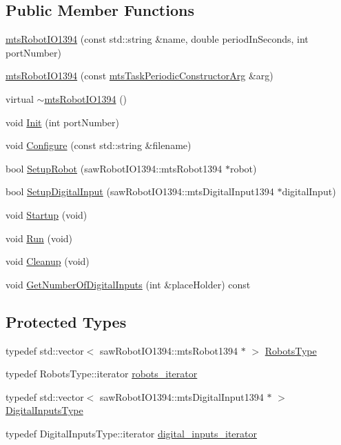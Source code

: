 \subsection*{Public Member Functions}
\begin{DoxyCompactItemize}
\item 
\hyperlink{classmts_robot_i_o1394_aee827574818e204a24ae21a0604a2547}{mts\+Robot\+I\+O1394} (const std\+::string \&name, double period\+In\+Seconds, int port\+Number)
\item 
\hyperlink{classmts_robot_i_o1394_a99cca8cfc575891d365ce310f984be99}{mts\+Robot\+I\+O1394} (const \hyperlink{classmts_task_periodic_constructor_arg}{mts\+Task\+Periodic\+Constructor\+Arg} \&arg)
\item 
virtual \hyperlink{classmts_robot_i_o1394_a0b6641e7214766380c3a786e5d264101}{$\sim$mts\+Robot\+I\+O1394} ()
\item 
void \hyperlink{classmts_robot_i_o1394_af8a3a179c51798e82d7d2494e6b44bb2}{Init} (int port\+Number)
\item 
void \hyperlink{classmts_robot_i_o1394_a306c3ced635583f7d0e197e0fd6118cb}{Configure} (const std\+::string \&filename)
\item 
bool \hyperlink{classmts_robot_i_o1394_acc8de15da51c663bd402c13958693b0e}{Setup\+Robot} (saw\+Robot\+I\+O1394\+::mts\+Robot1394 $\ast$robot)
\item 
bool \hyperlink{classmts_robot_i_o1394_af5a72252e919132a32cc2b800508bf16}{Setup\+Digital\+Input} (saw\+Robot\+I\+O1394\+::mts\+Digital\+Input1394 $\ast$digital\+Input)
\item 
void \hyperlink{classmts_robot_i_o1394_acd53cbdb68ee67bdc55da6312a407043}{Startup} (void)
\item 
void \hyperlink{classmts_robot_i_o1394_a01fea2cc930d89b666f603b27eed61ba}{Run} (void)
\item 
void \hyperlink{classmts_robot_i_o1394_a0ffa72f9f6d3c23d19cb592f325f8e39}{Cleanup} (void)
\item 
void \hyperlink{classmts_robot_i_o1394_a46df5d7d8527d73c5fdd40806899fbdb}{Get\+Number\+Of\+Digital\+Inputs} (int \&place\+Holder) const 
\end{DoxyCompactItemize}
\subsection*{Protected Types}
\begin{DoxyCompactItemize}
\item 
typedef std\+::vector$<$ saw\+Robot\+I\+O1394\+::mts\+Robot1394 $\ast$ $>$ \hyperlink{classmts_robot_i_o1394_ab8da6d2d438f82df01169c5bd528c9b3}{Robots\+Type}
\item 
typedef Robots\+Type\+::iterator \hyperlink{classmts_robot_i_o1394_a7f8edd25871894ed25f59c68d3c49ece}{robots\+\_\+iterator}
\item 
typedef std\+::vector$<$ saw\+Robot\+I\+O1394\+::mts\+Digital\+Input1394 $\ast$ $>$ \hyperlink{classmts_robot_i_o1394_ad8b711c653d6fc68084cbe7817e066b9}{Digital\+Inputs\+Type}
\item 
typedef Digital\+Inputs\+Type\+::iterator \hyperlink{classmts_robot_i_o1394_abd444ca2070d97fbd3c0d7d23049efcc}{digital\+\_\+inputs\+\_\+iterator}
\end{DoxyCompactItemize}
